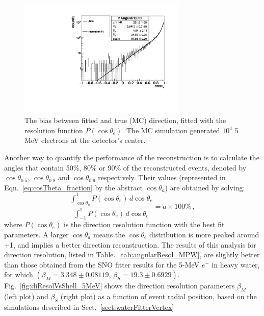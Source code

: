 \begin{figure}[htbp]
	\centering
	\includegraphics[width=8cm]{MPW_waterDirection_5MeV.pdf}
	\caption[The bias between the fitted and true (MC) direction.]{The bias between fitted and true (MC) direction, fitted with the resolution function $P(\cos\theta_e)$. The MC simulation generated $10^4$ 5 MeV electrons at the detector's center.\label{fig:directionResol_5MeV}}%
\end{figure}

Another way to quantify the performance of the reconstruction is to calculate the angles that contain 50\%, 80\%
or 90\% of the reconstructed events, denoted by $\cos\theta_{0.5}$, $\cos\theta_{0.8}$ and $\cos\theta_{0.9}$ respectively\cite{coulter2013modelling}. Their values (represented in Eqn.~\ref{eq:cosTheta_fraction} by the abstract $\cos\theta_{a}$) are obtained by solving:
\begin{equation}\label{eq:cosTheta_fraction}
\frac{\int_{\cos\theta_{a}}^1 P(\cos\theta_e) \, d\cos\theta_e}{\int_{-1}^1 P(\cos\theta_e) \, d\cos\theta_e} = a\times 100\% \, ,
\end{equation}
where $P(\cos\theta_e)$ is the direction resolution function with the best fit parameters. A larger $\cos\theta_{a}$ means the $\cos\theta_e$ distribution is more peaked around +1, and implies a better direction reconstruction. The results of this analysis for direction resolution, listed in Table.~\ref{tab:angularResol_MPW}, are slightly better than those obtained from the SNO fitter results for the 5-MeV $e^-$ in heavy water, for which \cite{boulay2004direct} $(\beta_M=3.348\pm 0.08119, \, \beta_S=19.3\pm 0.6929)$. Fig.~\ref{fig:diResolVsShell_5MeV} shows the direction resolution parameters $\beta_M$ (left plot) and $\beta_S$ (right plot) as a function of event radial position, based on the simulations described in Sect.~\ref{sect:waterFitterVertex}

